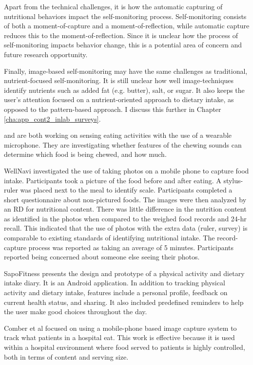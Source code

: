 Apart from the technical challenges, it is how the automatic capturing of nutritional behaviors impact the self-monitoring process. Self-monitoring consists of both a moment-of-capture and a moment-of-reflection, while automatic capture reduces this to the moment-of-reflection. Since it is unclear how the process of self-monitoring impacts behavior change, this is a potential area of concern and future research opportunity. 

Finally, image-based self-monitoring may have the same challenges as traditional, nutrient-focused self-monitoring. It is still unclear how well image-techniques identify nutrients such as added fat (e.g. butter), salt, or sugar. It also keeps the user's attention focused on a nutrient-oriented approach to dietary intake, as opposed to the pattern-based approach. I discuss this further in Chapter \ref{cha:app_cont2_inlab_surveys}. 

\citep{Pabler2011} and \citep{amft_detection_2005} are both working on sensing eating activities with the use of a wearable microphone. They are investigating whether features of the chewing sounds can determine which food is being chewed, and how much. 

WellNavi \citep{wang_development_2006} investigated the use of taking photos on a mobile phone to capture food intake. Participants took a picture of the food before and after eating.  A stylus-ruler was placed next to the meal to identify scale. Participants completed a short questionnaire about non-pictured foods. The images were then analyzed by an RD for nutritional content. There was little difference in the nutrition content as identified in the photos when compared to the weighed food records and 24-hr recall. This indicated that the use of photos with the extra data (ruler, survey) is comparable to existing standards of identifying nutritional intake. The record-capture process was reported as taking an average of 5 minutes. Participants reported being concerned about someone else seeing their photos. 


SapoFitness \citep{silva_sapofitness:_2011} presents the design and prototype of a physical activity and dietary intake diary. It is an Android application. In addition to tracking physical activity and dietary intake, features include a personal profile, feedback on current health status, and sharing. It also included predefined reminders to help the user make good choices throughout the day. 



Comber et al \citep{comber_supporting_2012} focused on using a mobile-phone based image capture system to track what patients in a hospital eat. This work is effective because it is used within a hospital environment where food served to patients is highly controlled, both in terms of content and serving size. 



